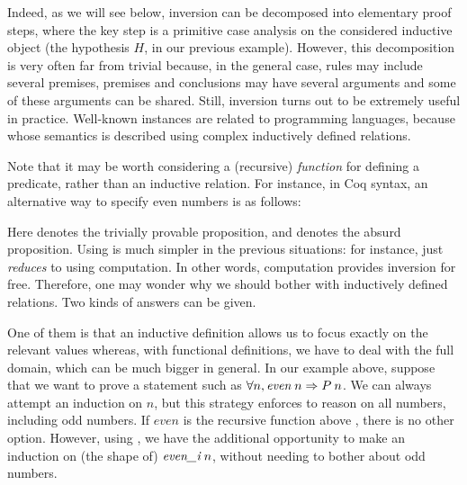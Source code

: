 Indeed, as we will see below, 
inversion can be decomposed into elementary proof steps,
where the key step is a primitive case analysis on the considered
inductive object (the hypothesis $H$, in our previous example). 
However, this decomposition is very often far from trivial because,
in the general case, rules may include several premises,
premises and conclusions may have several arguments and
some of these arguments can be shared.
Still, inversion turns out to be extremely useful in practice.
Well-known instances are related to programming languages,
because whose semantics is described using complex inductively defined
relations. 

Note that it may be worth considering a (recursive) \emph{function}
for defining a predicate, rather than an inductive relation.
For instance, in Coq syntax, an alternative way to specify even
numbers is as follows:


\medskip
{}
\medskip

\noindent
Here  denotes the trivially provable proposition,
and  denotes the absurd proposition.
%
Using  is much simpler in the previous situations:
for instance,  just \emph{reduces} to
 using computation.
In other words, computation provides inversion for free.
Therefore, one may wonder why we should bother with inductively defined
relations.
Two kinds of answers can be given.

One of them is that an inductive definition allows us 
to focus exactly on the relevant values
whereas, with functional definitions,
we have to deal with the full domain,
which can be much bigger in general.
In our example above,
suppose that we want to prove a statement such as
$\forall n, \mathit{even}\:n \Rightarrow P\: n$.
We can always attempt an induction on $n$,
but this strategy enforces to reason on all numbers, 
including odd numbers.
If $\mathit{even}$ is the recursive function above ,
there is no other option.
However, using , 
we have the additional opportunity to make an induction on 
(the shape of) $\textit{even\_i}\;n$,
without needing to bother about odd numbers.

